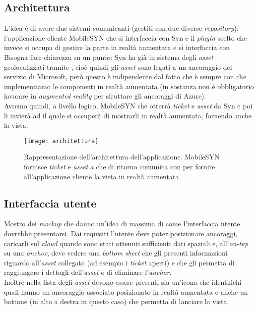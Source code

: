\subsection{Architettura}
L'idea è di avere due sistemi comunicanti (gestiti con due diverse \textit{repository}): l'applicazione cliente MobileSYN che si interfaccia con Syn e il \textit{plugin} scelto che invece si occupa di gestire la parte in realtà aumentata e si interfaccia con \asa{}. \\
Bisogna fare chiarezza su un punto: Syn ha già in sistema degli \textit{asset} geolocalizzati tramite \asa{}, cioè quindi gli \textit{asset} sono legati a un ancoraggio del servizio di Microsoft, però questo è indipendente dal fatto che è sempre con \asa{} che implementiamo le componenti in realtà aumentata (in sostanza non è obbligatorio lavorare in \textit{augmented reality} per sfruttare gli ancoraggi di Azure). \\
Avremo quindi, a livello logico, MobileSYN che otterrà \textit{ticket} e \textit{asset} da Syn e poi li invierà ad \aplug{} il quale si occuperà di mostrarli in realtà aumentata, fornendo anche la vista.

\begin{figure}[H]
  \centering
  \texttt{[image: architettura]}\hfill
  \caption[Architettura \textit{app}]{Rappresentazione dell'architettura dell'applicazione. MobileSYN fornisce \textit{ticket} e \textit{asset} a \aplug{} che di ritorno comunica con \asa{} per fornire all'applicazione cliente la vista in realtà aumentata.}
\end{figure}

\subsection{Interfaccia utente}
Mostro dei \textit{mockup} che danno un'idea di massima di come l'interfaccia utente dovrebbe presentarsi. Dai requisiti l'utente deve poter posizionare ancoraggi, caricarli sul \textit{cloud} quando sono stati ottenuti sufficienti dati spaziali e, all'\textit{on-tap} su una \textit{anchor}, deve vedere una \textit{bottom sheet} che gli presenti informazioni riguardo all'\textit{asset} collegato (ad esempio i \textit{ticket} aperti) e che gli permetta di raggiungere i dettagli dell'\textit{asset} o di eliminare l'\textit{anchor}.\\
Inoltre nella lista degli \textit{asset} devono essere presenti sia un'icona che identifichi quali hanno un ancoraggio associato posizionato in realtà aumentata e anche un bottone (in alto a destra in questo caso) che permetta di lanciare la vista.

